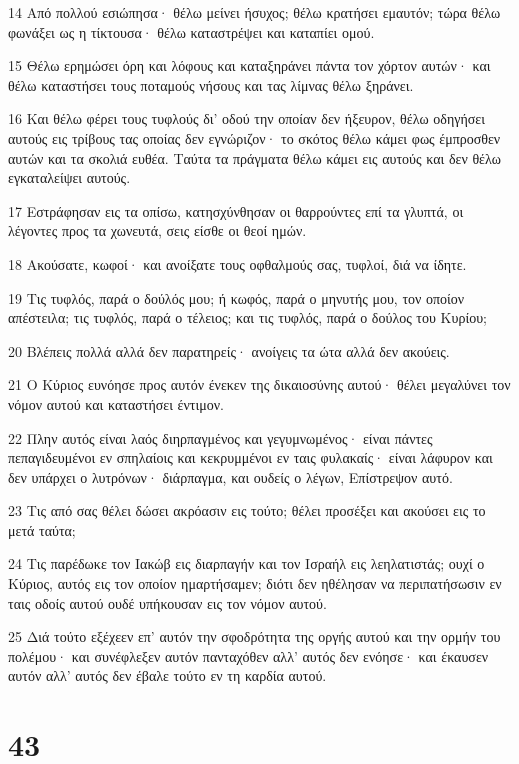 \par 14 Από πολλού εσιώπησα· θέλω μείνει ήσυχος; θέλω κρατήσει εμαυτόν; τώρα θέλω φωνάξει ως η τίκτουσα· θέλω καταστρέψει και καταπίει ομού.
\par 15 Θέλω ερημώσει όρη και λόφους και καταξηράνει πάντα τον χόρτον αυτών· και θέλω καταστήσει τους ποταμούς νήσους και τας λίμνας θέλω ξηράνει.
\par 16 Και θέλω φέρει τους τυφλούς δι' οδού την οποίαν δεν ήξευρον, θέλω οδηγήσει αυτούς εις τρίβους τας οποίας δεν εγνώριζον· το σκότος θέλω κάμει φως έμπροσθεν αυτών και τα σκολιά ευθέα. Ταύτα τα πράγματα θέλω κάμει εις αυτούς και δεν θέλω εγκαταλείψει αυτούς.
\par 17 Εστράφησαν εις τα οπίσω, κατησχύνθησαν οι θαρρούντες επί τα γλυπτά, οι λέγοντες προς τα χωνευτά, σεις είσθε οι θεοί ημών.
\par 18 Ακούσατε, κωφοί· και ανοίξατε τους οφθαλμούς σας, τυφλοί, διά να ίδητε.
\par 19 Τις τυφλός, παρά ο δούλός μου; ή κωφός, παρά ο μηνυτής μου, τον οποίον απέστειλα; τις τυφλός, παρά ο τέλειος; και τις τυφλός, παρά ο δούλος του Κυρίου;
\par 20 Βλέπεις πολλά αλλά δεν παρατηρείς· ανοίγεις τα ώτα αλλά δεν ακούεις.
\par 21 Ο Κύριος ευνόησε προς αυτόν ένεκεν της δικαιοσύνης αυτού· θέλει μεγαλύνει τον νόμον αυτού και καταστήσει έντιμον.
\par 22 Πλην αυτός είναι λαός διηρπαγμένος και γεγυμνωμένος· είναι πάντες πεπαγιδευμένοι εν σπηλαίοις και κεκρυμμένοι εν ταις φυλακαίς· είναι λάφυρον και δεν υπάρχει ο λυτρόνων· διάρπαγμα, και ουδείς ο λέγων, Επίστρεψον αυτό.
\par 23 Τις από σας θέλει δώσει ακρόασιν εις τούτο; θέλει προσέξει και ακούσει εις το μετά ταύτα;
\par 24 Τις παρέδωκε τον Ιακώβ εις διαρπαγήν και τον Ισραήλ εις λεηλατιστάς; ουχί ο Κύριος, αυτός εις τον οποίον ημαρτήσαμεν; διότι δεν ηθέλησαν να περιπατήσωσιν εν ταις οδοίς αυτού ουδέ υπήκουσαν εις τον νόμον αυτού.
\par 25 Διά τούτο εξέχεεν επ' αυτόν την σφοδρότητα της οργής αυτού και την ορμήν του πολέμου· και συνέφλεξεν αυτόν πανταχόθεν αλλ' αυτός δεν ενόησε· και έκαυσεν αυτόν αλλ' αυτός δεν έβαλε τούτο εν τη καρδία αυτού.

\chapter{43}

